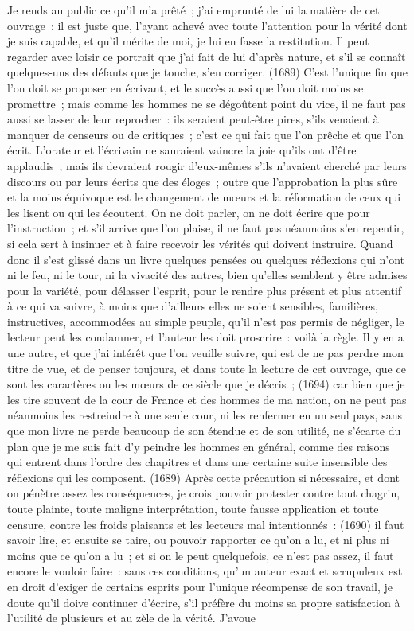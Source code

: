 \documentclass[french,twoside]{book} %
\newcommand{\ed}[1]{ {\color{silver}\sffamily\footnotesize (#1)} } %
\newcommand\chaptercont{} %
\begin{document}
\chaptercont
\noindent Je rends au public ce qu’il m’a prêté ; j’ai emprunté de lui la matière de cet ouvrage : il est juste que, l’ayant achevé avec toute l’attention pour la vérité dont je suis capable, et qu’il mérite de moi, je lui en fasse la restitution. Il peut regarder avec loisir ce portrait que j’ai fait de lui d’après nature, et s’il se connaît quelques-uns des défauts que je touche, s’en corriger. \ed{1689}C'est l’unique fin que l’on doit se proposer en écrivant, et le succès aussi que l’on doit moins se promettre ; mais comme les hommes ne se dégoûtent point du vice, il ne faut pas aussi se lasser de leur reprocher : ils seraient peut-être pires, s’ils venaient à manquer de censeurs ou de critiques ; c’est ce qui fait que l’on prêche et que l’on écrit. L'orateur et l’écrivain ne sauraient vaincre la joie qu’ils ont d’être applaudis ; mais ils devraient rougir d’eux-mêmes s’ils n’avaient cherché par leurs discours ou par leurs écrits que des éloges ; outre que l’approbation la plus sûre et la moins équivoque est le changement de mœurs et la réformation de ceux qui les lisent ou qui les écoutent. On ne doit parler, on ne doit écrire que pour l’instruction ; et s’il arrive que l’on plaise, il ne faut pas néanmoins s’en repentir, si cela sert à insinuer et à faire recevoir les vérités qui doivent instruire. Quand donc il s’est glissé dans un livre quelques pensées ou quelques réflexions qui n’ont ni le feu, ni le tour, ni la vivacité des autres, bien qu’elles semblent y être admises pour la variété, pour délasser l’esprit, pour le rendre plus présent et plus attentif à ce qui va suivre, à moins que d’ailleurs elles ne soient sensibles, familières, instructives, accommodées au simple peuple, qu’il n’est pas permis de négliger, le lecteur peut les condamner, et l’auteur les doit proscrire : voilà la règle. Il y en a une autre, et que j’ai intérêt que l’on veuille suivre, qui est de ne pas perdre mon titre de vue, et de penser toujours, et dans toute la lecture de cet ouvrage, que ce sont les caractères ou les mœurs de ce siècle que je décris ; \ed{1694}car bien que je les tire souvent de la cour de France et des hommes de ma nation, on ne peut pas néanmoins les restreindre à une seule cour, ni les renfermer en un seul pays, sans que mon livre ne perde beaucoup de son étendue et de son utilité, ne s’écarte du plan que je me suis fait d’y peindre les hommes en général, comme des raisons qui entrent dans l’ordre des chapitres et dans une certaine suite insensible des réflexions qui les composent. \ed{1689}Après cette précaution si nécessaire, et dont on pénètre assez les conséquences, je crois pouvoir protester contre tout chagrin, toute plainte, toute maligne interprétation, toute fausse application et toute censure, contre les froids plaisants et les lecteurs mal intentionnés : \ed{1690}il faut savoir lire, et ensuite se taire, ou pouvoir rapporter ce qu’on a lu, et ni plus ni moins que ce qu’on a lu ; et si on le peut quelquefois, ce n’est pas assez, il faut encore le vouloir faire : sans ces conditions, qu’un auteur exact et scrupuleux est en droit d’exiger de certains esprits pour l’unique récompense de son travail, je doute qu’il doive continuer d’écrire, s’il préfère du moins sa propre satisfaction à l’utilité de plusieurs et au zèle de la vérité. J'avoue 
\end{document}
